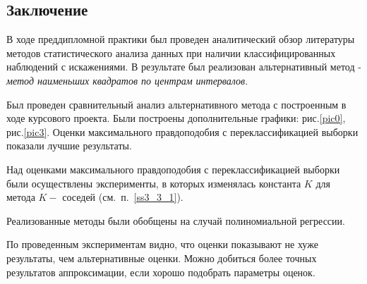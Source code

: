 \begin{center}
    \section*{Заключение}
\end{center}
{}

В ходе преддипломной практики был проведен аналитический обзор литературы методов статистического анализа данных при наличии классифицированных наблюдений с искажениями.
В результате был реализован альтернативный метод - \textit{метод наименьших квадратов по центрам интервалов}.

Был проведен сравнительный анализ альтернативного метода с построенным в ходе курсового проекта. Были построены дополнительные графики: рис.\ref{pic0}, рис.\ref{pic3}. Оценки максимального правдоподобия с переклассификацией выборки показали лучшие результаты. 

Над оценками максимального правдоподобия с переклассификацией выборки были осуществлены эксперименты, в которых изменялась константа $K$ для метода $K-$ соседей (см.~п.~\ref{ss3_3_1}).

Реализованные методы были обобщены на случай полиномиальной регрессии.


По проведенным экспериментам видно, что оценки показывают не хуже результаты, чем альтернативные оценки.
Можно добиться более точных результатов аппроксимации, если хорошо подобрать параметры оценок.